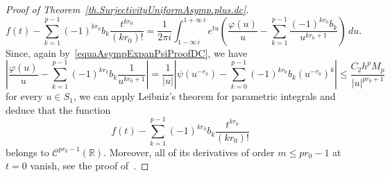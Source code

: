 \documentclass[11pt,a4paper]{article}
\theoremstyle{plain}
\theoremstyle{definition}
\numberwithin{equation}{section}
\newcommand{\R}{\mathbb{R}}
\begin{document}
\begin{proof}[Proof of Theorem~\ref{th.SurjectivityUniformAsymp.plus.dc}]
\begin{equation}
f(t)-\sum_{k=1}^{p-1}(-1)^{kr_0}b_k\frac{t^{kr_0}}{(kr_0)!}=
\frac{1}{2\pi i}\int_{1-\infty\,i}^{1+\infty\,i}e^{tu}
\left(\frac{\varphi(u)}{u}- \sum_{k=1}^{p-1}\frac{(-1)^{kr_0}b_k}{u^{kr_0+1}}\right)\,du.
\end{equation}
Since, again by~\eqref{equaAsympExpanPsiProofDC}, we have
\begin{equation}\label{equaRemainderPhiProofDC}
\left|\frac{\varphi(u)}{u}- \sum_{k=1}^{p-1}(-1)^{kr_0}b_k\frac{1}{u^{kr_0+1}}\right|=
\frac{1}{|u|}\left|\psi(u^{-r_0})- \sum_{k=0}^{p-1}(-1)^{kr_0}b_k(u^{-r_0})^k\right|\le
\frac{C_2h^pM_p}{|u|^{pr_0+1}}
\end{equation}
for every $u\in S_1$, we can apply Leibniz's theorem for parametric integrals and deduce that the function
$$
f(t)-\sum_{k=1}^{p-1}(-1)^{kr_0}b_k\frac{t^{kr_0}}{(kr_0)!}
$$
belongs to $\mathcal{C}^{pr_0-1}(\R)$. Moreover, all of its derivatives of order $m\le pr_0-1$ at $t=0$ vanish, see the proof of~\cite[Theorem 4.14(i)]{JimenezSanzSchindlInjectSurject}.


\end{proof}
\end{document}
